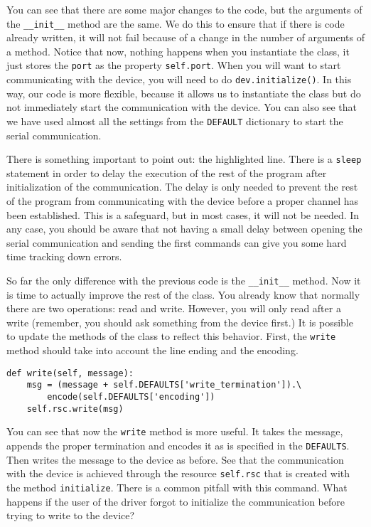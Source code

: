 You can see that there are some major changes to the code, but the
arguments of the \texttt{\_\_init\_\_} method are the same. We do this
to ensure that if there is code already written, it will not fail
because of a change in the number of arguments of a method. Notice that
now, nothing happens when you instantiate the class, it just stores the
\texttt{port} as the property \texttt{self.port}. When you will want to
start communicating with the device, you will need to do
\texttt{dev.initialize()}. In this way, our code is more flexible,
because it allows us to instantiate the class but do not immediately
start the communication with the device. You can also see that we have
used almost all the settings from the \texttt{DEFAULT} dictionary to
start the serial communication.

There is something important to point out: the highlighted line. There
is a \texttt{sleep} statement in order to delay the execution of the
rest of the program after initialization of the communication. The delay
is only needed to prevent the rest of the program from communicating
with the device before a proper channel has been established. This is a
safeguard, but in most cases, it will not be needed. In any case, you
should be aware that not having a small delay between opening the serial
communication and sending the first commands can give you some hard time
tracking down errors.

So far the only difference with the previous code is the
\texttt{\_\_init\_\_} method. Now it is time to actually improve the
rest of the class. You already know that normally there are two
operations: read and write. However, you will only read after a write
(remember, you should ask something from the device first.) It is
possible to update the methods of the class to reflect this behavior.
First, the \texttt{write} method should take into account the line ending
and the encoding.

\begin{verbatim}
def write(self, message):
    msg = (message + self.DEFAULTS['write_termination']).\
        encode(self.DEFAULTS['encoding'])
    self.rsc.write(msg)
\end{verbatim}

You can see that now the \texttt{write} method is more useful. It takes
the message, appends the proper termination and encodes it as is
specified in the \texttt{DEFAULTS}. Then writes the message to the
device as before. See that the communication with the device is achieved
through the resource \texttt{self.rsc} that is created with the method
\texttt{initialize}. There is a common pitfall with this command. What
happens if the user of the driver forgot to initialize the communication
before trying to write to the device?

